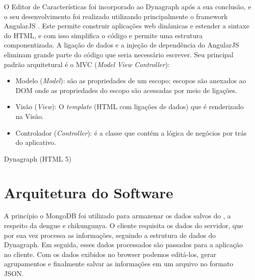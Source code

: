 O Editor de Características foi incorporado ao Dynagraph após a sua conclusão, e o seu desenvolvimento foi realizado utilizando principalmente o framework AngularJS \cite{angularjs}.
Este permite construir aplicações web dinâmicas e estender a sintaxe do HTML, e com isso simplifica o código e permite uma estrutura componentizada. A ligação de dados e a injeção de dependência do AngularJS eliminam grande parte do código que seria necessário escrever.
Seu principal padrão arquitetural é o MVC (\textit{Model View Controller}):
\begin{itemize}
	\item Modelo (\textit{Model}): são as propriedades de um escopo; escopos são anexados ao DOM onde as propriedades do escopo são acessadas por meio de ligações.
	\item Visão (\textit{View}): O \textit{template} (HTML com ligações de dados) que é renderizado na Visão.
	\item Controlador (\textit{Controller}): é a classe que contém a lógica de negócios por trás do aplicativo.
\end{itemize}


Dynagraph (HTML 5)

\section{Arquitetura do Software}
A princípio o MongoDB foi utilizado para armazenar os dados salvos do \cite{simda}, a respeito da dengue e chikungunya. O cliente requisita os dados do servidor, que por sua vez processa as informações, seguindo a estrutura de dados do Dynagraph. Em seguida, esses dados processados são passados para a aplicação no cliente. Com os dados exibidos no browser podemos editá-los, gerar agrupamentos e finalmente salvar as informações em um arquivo no formato JSON.

